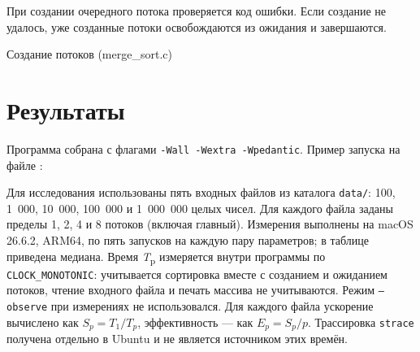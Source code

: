 \documentclass[12pt, a4paper]{article}
\begin{document}
При создании очередного потока проверяется код ошибки. Если создание
не удалось, уже созданные потоки освобождаются из ожидания и завершаются.

\begin{listingblock}{Создание потоков (merge\_sort.c)}
\end{listingblock}

\section{Результаты}

Программа собрана с флагами \texttt{-Wall -Wextra -Wpedantic}. Пример запуска
на файле :


Для исследования использованы пять входных файлов из каталога \texttt{data/}:
100, 1~000, 10~000, 100~000 и 1~000~000 целых чисел. Для каждого файла
заданы пределы 1, 2, 4 и 8 потоков (включая главный). Измерения выполнены
на macOS 26.6.2, ARM64, по пять запусков на каждую пару параметров; в таблице
приведена медиана. Время \textit{T}\textsubscript{p} измеряется внутри программы
по \texttt{CLOCK\_MONOTONIC}: учитывается сортировка вместе с созданием и
ожиданием потоков, чтение входного файла и печать массива не учитываются.
Режим \texttt{--observe} при измерениях не использовался. Для каждого файла
ускорение вычислено как $S_p=T_1/T_p$, эффективность --- как $E_p=S_p/p$.
Трассировка \texttt{strace} получена отдельно в Ubuntu и не является источником
этих времён.
\end{document}
